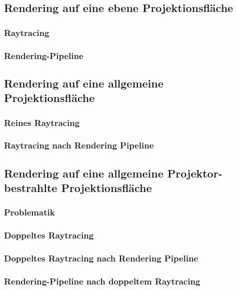 \documentclass[a4paper, 12pt]{article}
\begin{document}
\subsection{Rendering auf eine ebene Projektionsfläche}

\subsubsection*{Raytracing}

\subsubsection*{Rendering-Pipeline}


\subsection{Rendering auf eine allgemeine Projektionsfläche}

\subsubsection*{Reines Raytracing}

\subsubsection*{Raytracing nach Rendering Pipeline}


\subsection{Rendering auf eine allgemeine Projektor-bestrahlte Projektionsfläche}

\subsubsection*{Problematik}

\subsubsection*{Doppeltes Raytracing}

\subsubsection*{Doppeltes Raytracing nach Rendering Pipeline}

\subsubsection*{Rendering-Pipeline nach doppeltem Raytracing}
\end{document}
